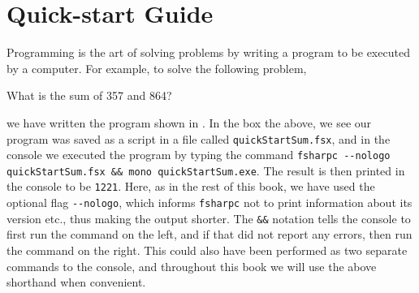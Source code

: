 \documentclass[fsharpnotes.tex]{subfiles}
\begin{document}
\chapter{Quick-start Guide}
Programming is the art of solving problems by writing a program to be executed by a computer. For example, to solve the following problem,
%
\begin{problem}
  What is the sum of 357 and 864?
  \label{probl:sumInteger}
\end{problem}
%
we have written the program shown in .
%
%
In the box the above, we see our program was saved as a script in a file called \lstinline[language=console]{quickStartSum.fsx}, and in the console we executed the program by typing the command \lstinline[language=console]|fsharpc --nologo quickStartSum.fsx && mono quickStartSum.exe|. The result is then printed in the console to be \lstinline{1221}. Here, as in the rest of this book, we have used the optional flag \lstinline[language=console]{--nologo}, which informs \lstinline|fsharpc| not to print information about its version etc., thus making the output shorter. The \lstinline[language=console]{&&} notation tells the console to first run the command on the left, and if that did not report any errors, then run the command on the right. This could also have been performed as two separate commands to the console, and throughout this book we will use the above shorthand when convenient.
\end{document}

